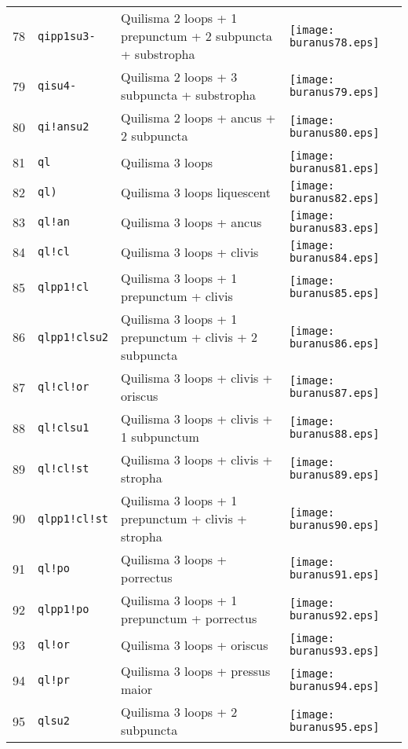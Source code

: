 \documentclass{scrarticle}
\begin{document}
\begin{longtable}{l|l|l|l}
78 & \texttt{qipp1su3-} & Quilisma 2 loops + 1 prepunctum + 2 subpuncta + substropha & \texttt{[image: buranus78.eps]} \\
79 & \texttt{qisu4-} & Quilisma 2 loops + 3 subpuncta + substropha & \texttt{[image: buranus79.eps]} \\
80 & \texttt{qi!ansu2} & Quilisma 2 loops + ancus + 2 subpuncta & \texttt{[image: buranus80.eps]} \\
81 & \texttt{ql} & Quilisma 3 loops & \texttt{[image: buranus81.eps]} \\
82 & \texttt{ql)} & Quilisma 3 loops liquescent & \texttt{[image: buranus82.eps]} \\
83 & \texttt{ql!an} & Quilisma 3 loops + ancus & \texttt{[image: buranus83.eps]} \\
84 & \texttt{ql!cl} & Quilisma 3 loops + clivis & \texttt{[image: buranus84.eps]} \\
85 & \texttt{qlpp1!cl} & Quilisma 3 loops + 1 prepunctum + clivis & \texttt{[image: buranus85.eps]} \\
86 & \texttt{qlpp1!clsu2} & Quilisma 3 loops + 1 prepunctum + clivis + 2 subpuncta & \texttt{[image: buranus86.eps]} \\
87 & \texttt{ql!cl!or} & Quilisma 3 loops + clivis + oriscus & \texttt{[image: buranus87.eps]} \\
88 & \texttt{ql!clsu1} & Quilisma 3 loops + clivis + 1 subpunctum & \texttt{[image: buranus88.eps]} \\
89 & \texttt{ql!cl!st} & Quilisma 3 loops + clivis + stropha & \texttt{[image: buranus89.eps]} \\
90 & \texttt{qlpp1!cl!st} & Quilisma 3 loops + 1 prepunctum + clivis + stropha & \texttt{[image: buranus90.eps]} \\
91 & \texttt{ql!po} & Quilisma 3 loops + porrectus & \texttt{[image: buranus91.eps]} \\
92 & \texttt{qlpp1!po} & Quilisma 3 loops + 1 prepunctum + porrectus & \texttt{[image: buranus92.eps]} \\
93 & \texttt{ql!or} & Quilisma 3 loops + oriscus & \texttt{[image: buranus93.eps]} \\
94 & \texttt{ql!pr} & Quilisma 3 loops + pressus maior & \texttt{[image: buranus94.eps]} \\
95 & \texttt{qlsu2} & Quilisma 3 loops + 2 subpuncta & \texttt{[image: buranus95.eps]} \\

\end{longtable}
\end{document}
